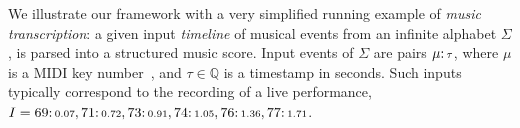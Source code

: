 

        
        
\begin{example}%
\label{ex:running}
We illustrate our framework with a very simplified %
running example of \emph{music transcription}:
a given input \emph{timeline} of musical events
from an infinite alphabet $\Sigma$,
is parsed into a structured music score.
Input events of $\Sigma$
are pairs $\mu \mathpunct{:}{\scriptstyle \tau}$, where $\mu$ is a
MIDI key number~\cite{Selfridge-Field97beyondMIDI}, %
and $\tau \in \mathbb{Q}$ is a timestamp in seconds.
Such inputs typically correspond
to the recording of a live performance, 
\eg~$I = 69\mathpunct{:}{\scriptstyle 0.07},
	     71\mathpunct{:}{\scriptstyle 0.72},
    	 73\mathpunct{:}{\scriptstyle 0.91},
	     74\mathpunct{:}{\scriptstyle 1.05},
	     76\mathpunct{:}{\scriptstyle 1.36},
	     77\mathpunct{:}{\scriptstyle 1.71}$. %


\end{example}
